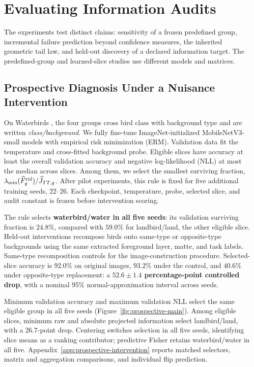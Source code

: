 \section{Evaluating Information Audits}
\label{sec:experiments}

The experiments test distinct claims: sensitivity of a frozen predefined group, incremental failure prediction beyond confidence measures, the inherited geometric tail law, and held-out discovery of a declared information target. The predefined-group and learned-slice studies use different models and matrices.

\subsection{Prospective Diagnosis Under a Nuisance Intervention}
\label{sec:prospective-diagnosis}

On Waterbirds \citep{sagawa2019distributionally}, the four groups cross bird class with background type and are written \emph{class/background}. We fully fine-tune ImageNet-initialized MobileNetV3-small models \citep{howard2019searching} with empirical risk minimization (ERM). Validation data fit the temperature and cross-fitted background probe. Eligible slices have accuracy at least the overall validation accuracy and negative log-likelihood (NLL) at most the median across slices. Among them, we select the smallest surviving fraction, $\lambda_{\min}(\widehat F_g^{\mathrm{rid}})/\widehat J_{TT,g}$. After pilot experiments, this rule is fixed for five additional training seeds, 22--26. Each checkpoint, temperature, probe, selected slice, and audit constant is frozen before intervention scoring.

The rule selects \textbf{waterbird/water in all five seeds}: its validation surviving fraction is $24.8\%$, compared with $59.0\%$ for landbird/land, the other eligible slice. Held-out interventions recompose birds onto same-type or opposite-type backgrounds using the same extracted foreground layer, matte, and task labels. Same-type recomposition controls for the image-construction procedure. Selected-slice accuracy is $92.0\%$ on original images, $93.2\%$ under the control, and $40.6\%$ under opposite-type replacement: a \textbf{$52.6\pm1.4$ percentage-point controlled drop}, with a nominal 95\% normal-approximation interval across seeds.

Minimum validation accuracy and maximum validation NLL select the same eligible group in all five seeds (Figure~\ref{fig:prospective-main}). Among eligible slices, minimum raw and absolute projected information select landbird/land, with a $26.7$-point drop. Centering switches selection in all five seeds, identifying slice means as a ranking contributor; predictive Fisher retains waterbird/water in all five. Appendix~\ref{app:prospective-intervention} reports matched selectors, matrix and aggregation comparisons, and individual flip prediction.

